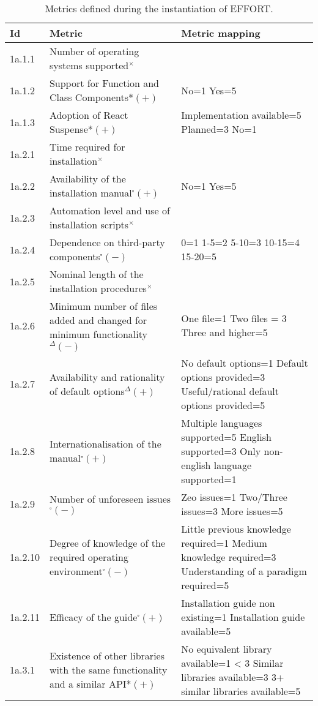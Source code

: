 \begin{longtable}[]{|p{1cm}p{6cm}p{6cm}|}
    \caption{Metrics defined during the instantiation of EFFORT.}
    \label{table:metrics_minified}\\
\toprule
Id & Metric & Metric mapping \\
\midrule
\endhead
1a.1.1 & Number of operating systems supported$^{\times}$ & \\
1a.1.2 & Support for Function and Class Components*$(+)$ & No=1 Yes=5 \\
1a.1.3 & Adoption of React Suspense*$(+)$ & Implementation available=5
Planned=3 No=1 \\
1a.2.1 & Time required for installation$^{\times}$ & \\
1a.2.2 & Availability of the installation manual$^{\square}(+)$ & No=1 Yes=5 \\
1a.2.3 & Automation level and use of installation scripts$^{\times}$ & \\
1a.2.4 & Dependence on third-party components$^{\square}(-)$ & 0=1 1-5=2 5-10=3 10-15=4 15-20=5 \\
1a.2.5 & Nominal length of the installation procedures$^{\times}$ & \\
1a.2.6 & Minimum number of files added and changed for minimum functionality$^{\Delta}(-)$ & One file=1 Two files = 3 Three and higher=5 \\
1a.2.7 & Availability and rationality of default options$^{\Delta}(+)$ & No default options=1 Default options provided=3 Useful/rational default options provided=5 \\
1a.2.8 & Internationalisation of the manual$^{\square}(+)$ & Multiple languages supported=5 English supported=3 Only non-english language supported=1 \\
1a.2.9 & Number of unforeseen issues$^{\square}(-)$ & Zeo issues=1 Two/Three issues=3 More issues=5 \\
1a.2.10 & Degree of knowledge of the required operating environment$^{\square}(-)$ & Little previous knowledge required=1 Medium knowledge required=3 Understanding of a paradigm required=5 \\
1a.2.11 & Efficacy of the guide$^{\square}(+)$ & Installation guide non existing=1
Installation guide available=5 \\
1a.3.1 & Existence of other libraries with the same functionality and a
similar API*$(+)$ & No equivalent library available=1 \textless{} 3 Similar
libraries available=3 3+ similar libraries available=5 \\

\end{longtable}
